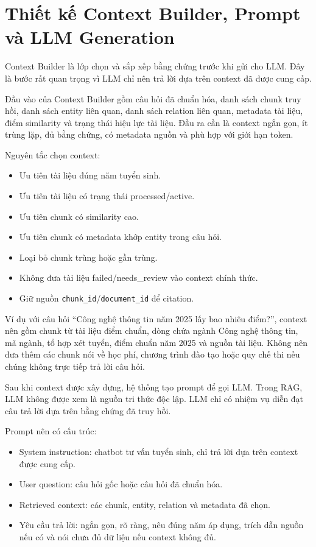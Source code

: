 \section{Thiết kế Context Builder, Prompt và LLM Generation}

Context Builder là lớp chọn và sắp xếp bằng chứng trước khi gửi cho LLM. Đây là bước rất quan trọng vì LLM chỉ nên trả lời dựa trên context đã được cung cấp.

Đầu vào của Context Builder gồm câu hỏi đã chuẩn hóa, danh sách chunk truy hồi, danh sách entity liên quan, danh sách relation liên quan, metadata tài liệu, điểm similarity và trạng thái hiệu lực tài liệu. Đầu ra cần là context ngắn gọn, ít trùng lặp, đủ bằng chứng, có metadata nguồn và phù hợp với giới hạn token.

Nguyên tắc chọn context:

\begin{itemize}
    \item Ưu tiên tài liệu đúng năm tuyển sinh.
    \item Ưu tiên tài liệu có trạng thái processed/active.
    \item Ưu tiên chunk có similarity cao.
    \item Ưu tiên chunk có metadata khớp entity trong câu hỏi.
    \item Loại bỏ chunk trùng hoặc gần trùng.
    \item Không đưa tài liệu failed/needs\_review vào context chính thức.
    \item Giữ nguồn \texttt{chunk\_id}/\texttt{document\_id} để citation.
\end{itemize}

Ví dụ với câu hỏi ``Công nghệ thông tin năm 2025 lấy bao nhiêu điểm?'', context nên gồm chunk từ tài liệu điểm chuẩn, dòng chứa ngành Công nghệ thông tin, mã ngành, tổ hợp xét tuyển, điểm chuẩn năm 2025 và nguồn tài liệu. Không nên đưa thêm các chunk nói về học phí, chương trình đào tạo hoặc quy chế thi nếu chúng không trực tiếp trả lời câu hỏi.

Sau khi context được xây dựng, hệ thống tạo prompt để gọi LLM. Trong RAG, LLM không được xem là nguồn tri thức độc lập. LLM chỉ có nhiệm vụ diễn đạt câu trả lời dựa trên bằng chứng đã truy hồi.

Prompt nên có cấu trúc:

\begin{itemize}
    \item System instruction: chatbot tư vấn tuyển sinh, chỉ trả lời dựa trên context được cung cấp.
    \item User question: câu hỏi gốc hoặc câu hỏi đã chuẩn hóa.
    \item Retrieved context: các chunk, entity, relation và metadata đã chọn.
    \item Yêu cầu trả lời: ngắn gọn, rõ ràng, nêu đúng năm áp dụng, trích dẫn nguồn nếu có và nói chưa đủ dữ liệu nếu context không đủ.
\end{itemize}

